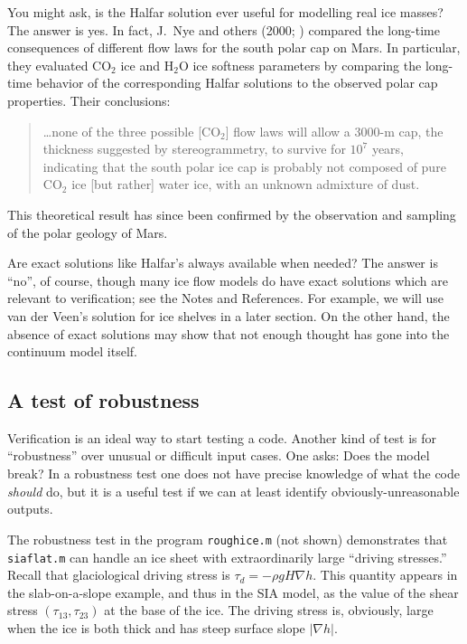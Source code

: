 \documentclass[letterpaper,final,12pt,reqno]{amsart}
\newcommand{\grad}{\nabla}
\begin{document}
You might ask, is the Halfar solution ever useful for modelling real ice masses?  The answer is yes.  In fact, J.~Nye and others (2000; \cite{NyeIcarus2000}) compared the long-time consequences of different flow laws for the south polar cap on Mars.  In particular, they evaluated $\text{CO}_2$ ice and $\text{H}_2\text{O}$ ice softness parameters by comparing the long-time behavior of the corresponding Halfar solutions to the observed polar cap properties.  Their conclusions:
  \begin{quote}
  \dots none of the three possible [$\text{CO}_2$] flow laws will allow a 3000-m cap, the thickness suggested by stereogrammetry, to survive for $10^7$ years, indicating that the south polar ice cap is probably not composed of pure $\text{CO}_2$ ice [but rather] water ice, with an unknown admixture of dust.
  \end{quote}
This theoretical result has since been confirmed by the observation and sampling of the polar geology of Mars.

Are exact solutions like Halfar's always available when needed?  The answer is ``no'', of course, though many ice flow models do have exact solutions which are relevant to verification; see the Notes and References.  For example, we will use van der Veen's solution for ice shelves in a later section.  On the other hand, the absence of exact solutions may show that not enough thought has gone into the continuum model itself.

\subsection*{A test of robustness}  Verification is an ideal way to start testing a code.  Another kind of test is for ``robustness'' over unusual or difficult input cases.  One asks: Does the model break?  In a robustness test one does not have precise knowledge of what the code \emph{should} do, but it is a useful test if we can at least identify obviously-unreasonable outputs.

The robustness test in the program \texttt{roughice.m} (not shown) demonstrates that \texttt{siaflat.m} can handle an ice sheet with extraordinarily large ``driving stresses.''  Recall that glaciological driving stress is $\tau_d = - \rho g H \grad h$.  This quantity appears in the slab-on-a-slope example, and thus in the SIA model, as the value of the shear stress $(\tau_{13},\tau_{23})$ at the base of the ice.  The driving stress is, obviously, large when the ice is both thick and has steep surface slope $|\nabla h|$.
\end{document}
